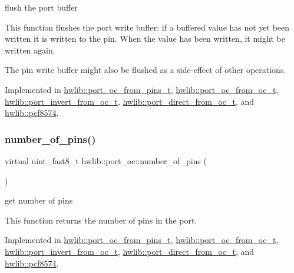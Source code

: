 flush the port buffer

This function flushes the port write buffer\+: if a buffered value has not yet been written it is written to the pin. When the value has been written, it might be written again.

The pin write buffer might also be flushed as a side-\/effect of other operations. 

Implemented in \hyperlink{classhwlib_1_1port__oc__from__pins__t_a981ca49914dc15275d775cb86b4742d5}{hwlib\+::port\+\_\+oc\+\_\+from\+\_\+pins\+\_\+t}, \hyperlink{classhwlib_1_1port__oc__from__oc__t_aa6bb9eaa0ecb5305a5cbbdfe16887c07}{hwlib\+::port\+\_\+oc\+\_\+from\+\_\+oc\+\_\+t}, \hyperlink{classhwlib_1_1port__invert__from__oc__t_af2b0e060990d5c507bd0b796d84a8777}{hwlib\+::port\+\_\+invert\+\_\+from\+\_\+oc\+\_\+t}, \hyperlink{classhwlib_1_1port__direct__from__oc__t_a3fe125af1f9ce2a5db5aa01b20c4d92e}{hwlib\+::port\+\_\+direct\+\_\+from\+\_\+oc\+\_\+t}, and \hyperlink{classhwlib_1_1pcf8574_a713a1ba3f48773641258ba1afdfc0127}{hwlib\+::pcf8574}.

\mbox{\label{classhwlib_1_1port__oc_a44d0dbfde290ad17237ad70c09a4c402}} 
\subsubsection{\texorpdfstring{number\+\_\+of\+\_\+pins()}{number\_of\_pins()}}
{\footnotesize\ttfamily virtual uint\+\_\+fast8\+\_\+t hwlib\+::port\+\_\+oc\+::number\+\_\+of\+\_\+pins (\begin{DoxyParamCaption}{ }\end{DoxyParamCaption})\hspace{0.3cm}{\ttfamily [pure virtual]}}





get number of pins

This function returns the number of pins in the port. 

Implemented in \hyperlink{classhwlib_1_1port__oc__from__pins__t_ae366a1c7b3790e5f0c78c8be813050d8}{hwlib\+::port\+\_\+oc\+\_\+from\+\_\+pins\+\_\+t}, \hyperlink{classhwlib_1_1port__oc__from__oc__t_a7836f8a9a50fb1311fb43b357cbe9310}{hwlib\+::port\+\_\+oc\+\_\+from\+\_\+oc\+\_\+t}, \hyperlink{classhwlib_1_1port__invert__from__oc__t_aebb0d0486a6a31d075ee9e4467f3a7f6}{hwlib\+::port\+\_\+invert\+\_\+from\+\_\+oc\+\_\+t}, \hyperlink{classhwlib_1_1port__direct__from__oc__t_aabab920072e42dcf903cb218f312f2da}{hwlib\+::port\+\_\+direct\+\_\+from\+\_\+oc\+\_\+t}, and \hyperlink{classhwlib_1_1pcf8574_abfe747fc30037f016334e2915a08f31a}{hwlib\+::pcf8574}.

